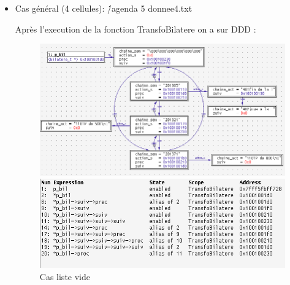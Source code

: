 \documentclass{report}
\begin{document}
\newpage
\begin{itemize}
    \item Cas général (4 cellules): \./agenda 5 donnee4.txt

\vspace{0.5cm}

\vspace{0.5cm}

Après l'execution de la fonction TransfoBilatere on a sur DDD :
\begin{figure}[!h] 
    \begin{center}
    \includegraphics[width=18cm]{cas_general.png}
    \caption{Cas liste vide} %
    \includegraphics[width=15cm]{tab_cas_general.png}
    \end{center}
\end{figure}
\end{itemize}

\newpage
\end{document}
